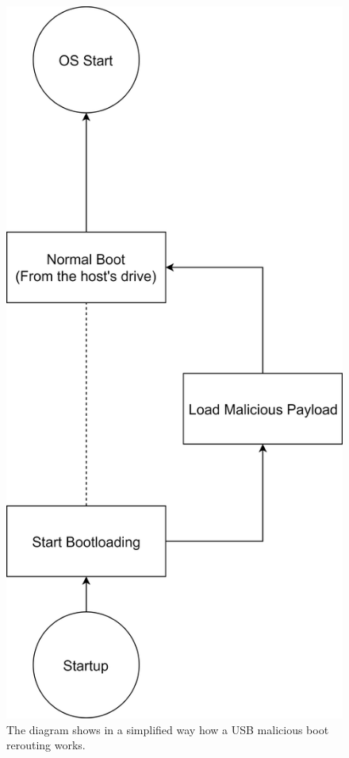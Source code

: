\documentclass[sigconf]{acmart}
\begin{document}
\begin{figure}[htp]
    \centering
    \includegraphics[width=\linewidth]{images/bootloading_rerouting.png}
    \caption{The diagram shows in a simplified way how a USB malicious boot rerouting works.}
    \label{fig:bootloading_rerouting}
\end{figure}
\end{document}
